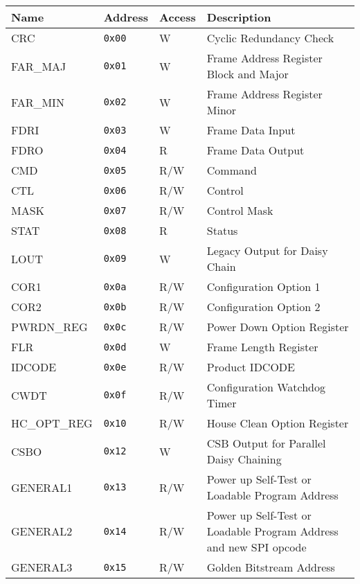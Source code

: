\documentclass{gqtekspec}
\begin{document}
\begin{table}[htbp]\begin{center}\hline
\begin{tabular}
\begin{tabular}{|p{0.75in}|p{0.75in}|p{0.5in}|p{2.875in}|}\hline
\rowcolor[gray]{0.85} Name  & Address & Access & Description \\\hline\hline
CRC          & {\tt 0x00} &   W & Cyclic Redundancy Check\\\hline
FAR\_MAJ     & {\tt 0x01} &   W & Frame Address Register Block and Major\\\hline
FAR\_MIN     & {\tt 0x02} &   W & Frame Address Register Minor\\\hline
FDRI         & {\tt 0x03} &   W & Frame Data Input\\\hline
FDRO         & {\tt 0x04} & R   & Frame Data Output\\\hline
CMD          & {\tt 0x05} & R/W & Command \\\hline
CTL          & {\tt 0x06} & R/W & Control \\\hline
MASK         & {\tt 0x07} & R/W & Control Mask\\\hline
STAT         & {\tt 0x08} & R   & Status \\\hline
LOUT         & {\tt 0x09} &   W & Legacy Output for Daisy Chain\\\hline
COR1         & {\tt 0x0a} & R/W & Configuration Option 1\\\hline
COR2         & {\tt 0x0b} & R/W & Configuration Option 2\\\hline
PWRDN\_REG   & {\tt 0x0c} & R/W & Power Down Option Register\\\hline
FLR          & {\tt 0x0d} &   W & Frame Length Register\\\hline
IDCODE       & {\tt 0x0e} & R/W & Product IDCODE\\\hline
CWDT         & {\tt 0x0f} & R/W & Configuration Watchdog Timer\\\hline
HC\_OPT\_REG & {\tt 0x10} & R/W & House Clean Option Register\\\hline
CSBO         & {\tt 0x12} &   W & CSB Output for Parallel Daisy Chaining\\\hline
GENERAL1     & {\tt 0x13} & R/W & Power up Self-Test or Loadable Program Address\\\hline
GENERAL2     & {\tt 0x14} & R/W & Power up Self-Test or Loadable Program Address and new SPI opcode\\\hline
GENERAL3     & {\tt 0x15} & R/W & Golden Bitstream Address\\\hline

\end{tabular}
\end{tabular}
\end{center}
\end{table}
\end{document}

